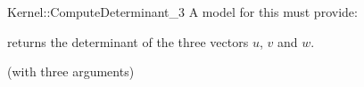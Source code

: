 \begin{ccRefFunctionObjectConcept}{Kernel::ComputeDeterminant_3}
A model for this must provide:


       {returns the determinant of the three vectors $u$, $v$ and $w$. }

\ccRefines
{} (with three arguments)

\ccSeeAlso
{} \\
  \\

\end{ccRefFunctionObjectConcept}
